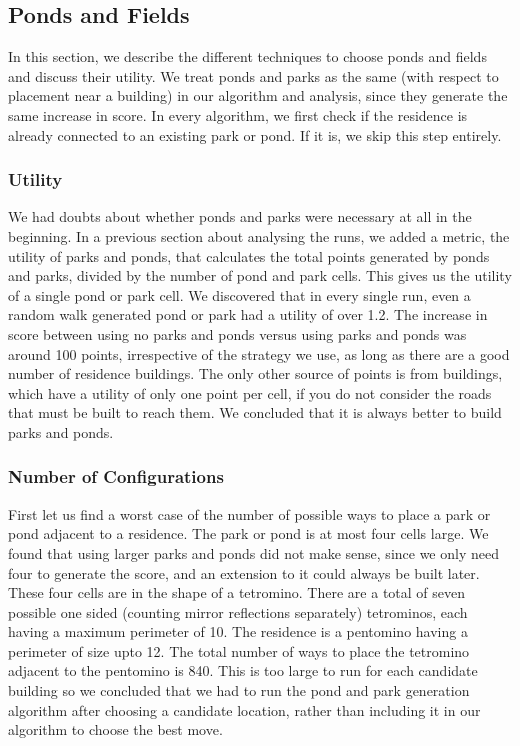 \subsection{Ponds and Fields}
In this section, we describe the different techniques to choose ponds and fields and discuss their utility. We treat ponds and parks as the same (with respect to placement near a building) in our algorithm and analysis, since they generate the same increase in score. In every algorithm, we first check if the residence is already connected to an existing park or pond. If it is, we skip this step entirely.

\subsubsection{Utility}
We had doubts about whether ponds and parks were necessary at all in the beginning. In a previous section about analysing the runs, we added a metric, the utility of parks and ponds, that calculates the total points generated by ponds and parks, divided by the number of pond and park cells. This gives us the utility of a single pond or park cell. We discovered that in every single run, even a random walk generated pond or park had a utility of over 1.2. The increase in score between using no parks and ponds versus using parks and ponds was around 100 points, irrespective of the strategy we use, as long as there are a good number of residence buildings. The only other source of points is from buildings, which have a utility of only one point per cell, if you do not consider the roads that must be built to reach them. We concluded that it is always better to build parks and ponds.

\subsubsection{Number of Configurations}
First let us find a worst case of the number of possible ways to place a park or pond adjacent to a residence. The park or pond is at most four cells large. We found that using larger parks and ponds did not make sense, since we only need four to generate the score, and an extension to it could always be built later. These four cells are in the shape of a tetromino. There are a total of seven possible one sided (counting mirror reflections separately) tetrominos, each having a maximum perimeter of 10. The residence is a pentomino having a perimeter of size upto 12. The total number of ways to place the tetromino adjacent to the pentomino is 840. This is too large to run for each candidate building so we concluded that we had to run the pond and park generation algorithm after choosing a candidate location, rather than including it in our algorithm to choose the best move.


